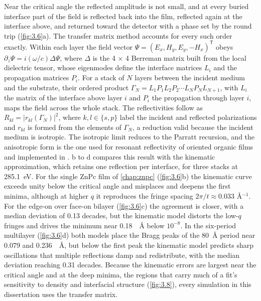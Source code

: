 Near the critical angle the reflected amplitude is not small, and at every buried interface part of the field is reflected back into the film, reflected again at the interface above, and returned toward the detector with a phase set by the round trip (\cref{fig:3.6}a). The transfer matrix method accounts for every such order exactly. Within each layer the field vector \(\Psi = \left( E_{x},H_{y},E_{y}, - H_{x} \right)^{\mathsf{T}}\) obeys \(\partial_{z}\Psi = i(\omega/c)\Delta\Psi\), where \(\Delta\) is the 4 × 4 Berreman matrix built from the local dielectric tensor\autocite{berremanOpticsStratifiedAnisotropic1972,passlerGeneralized442017,passlerGeneralized442019}, whose eigenmodes define the interface matrices \(L_{i}\) and the propagation matrices \(P_{i}\). For a stack of \(N\) layers between the incident medium and the substrate, their ordered product \(\Gamma_{N} = L_{1}P_{1}L_{2}P_{2}\cdots L_{N}P_{N}L_{N + 1}\), with \(L_{i}\) the matrix of the interface above layer \(i\) and \(P_{i}\) the propagation through layer \(i\), maps the field across the whole stack. The reflectivities follow as \(R_{kl} = \left| r_{kl}\left( \Gamma_{N} \right) \right|^{2}\), where \(k, l \in \{s, p\}\) label the incident and reflected polarizations and \(r_{kl}\) is formed from the elements of \(\Gamma_{N}\), a reduction valid because the incident medium is isotropic.\autocite{yehOpticsAnisotropicLayered1980} The isotropic limit reduces to the Parratt recursion,\autocite{parrattSurfaceStudiesSolids1954} and the anisotropic form is the one used for resonant reflectivity of oriented organic films\autocite{capelliQuantitativeResonantSoft2019,pasqualiStructuralElectronicProperties2014a,pasqualiAnalysisResonantSoft2021} and implemented in . b to d compares this result with the kinematic approximation, which retains one reflection per interface, for three stacks at \qty{285.1}{eV}. For the single ZnPc film of \cref{chap:znpc} (\cref{fig:3.6}b) the kinematic curve exceeds unity below the critical angle and misplaces and deepens the first minima, although at higher \(q\) it reproduces the fringe spacing \(2\pi/t \approx 0.033\) Å\(^{- 1}\). For the edge-on over face-on bilayer (\cref{fig:3.6}c) the agreement is closer, with a median deviation of 0.13 decades, but the kinematic model distorts the low-\(q\) fringes and drives the minimum near \qty{0.18}{\per\angstrom} below \(10^{- 8}\). In the six-period multilayer (\cref{fig:3.6}d) both models place the Bragg peaks of the \qty{80}{\angstrom} period near 0.079 and \qty{0.236}{\per\angstrom}, but below the first peak the kinematic model predicts sharp oscillations that multiple reflections damp and redistribute, with the median deviation reaching 0.31 decades. Because the kinematic errors are largest near the critical angle and at the deep minima, the regions that carry much of a fit's sensitivity to density and interfacial structure (\cref{fig:3.8}), every simulation in this dissertation uses the transfer matrix.

